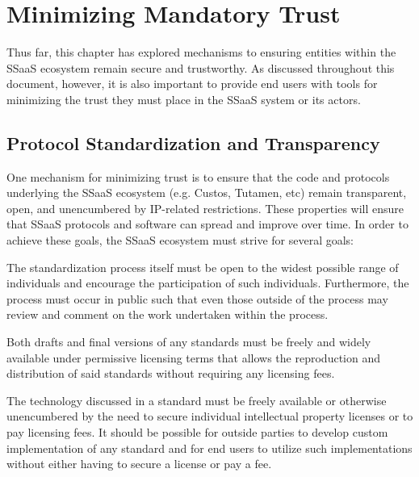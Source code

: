 \section{Minimizing Mandatory Trust}

Thus far, this chapter has explored mechanisms to ensuring entities
within the SSaaS ecosystem remain secure and trustworthy. As discussed
throughout this document, however, it is also important to provide
end users with tools for minimizing the trust they must place in the
SSaaS system or its actors. 

\subsection{Protocol Standardization and Transparency}

One mechanism for minimizing trust is to ensure that the code and
protocols underlying the SSaaS ecosystem (e.g. Custos, Tutamen, etc)
remain transparent, open, and unencumbered by IP-related
restrictions. These properties will ensure that SSaaS protocols and
software can spread and improve over time. In order to achieve these
goals, the SSaaS ecosystem must strive for several goals:

\begin{packed_desc}
\item[Openness of Process:] The standardization process itself must be
  open to the widest possible range of individuals and encourage the
  participation of such individuals. Furthermore, the process must
  occur in public such that even those outside of the process may
  review and comment on the work undertaken within the process.
\item[Availability of Standards:] Both drafts and final versions of
  any standards must be freely and widely available under permissive
  licensing terms that allows the reproduction and distribution of
  said standards without requiring any licensing fees.
\item[Unencumbered by Intellectual Property Restrictions:] The
  technology discussed in a standard must be freely available or
  otherwise unencumbered by the need to secure individual intellectual
  property licenses or to pay licensing fees. It should be possible
  for outside parties to develop custom implementation of any standard
  and for end users to utilize such implementations without either
  having to secure a license or pay a fee.
\end{packed_desc}

